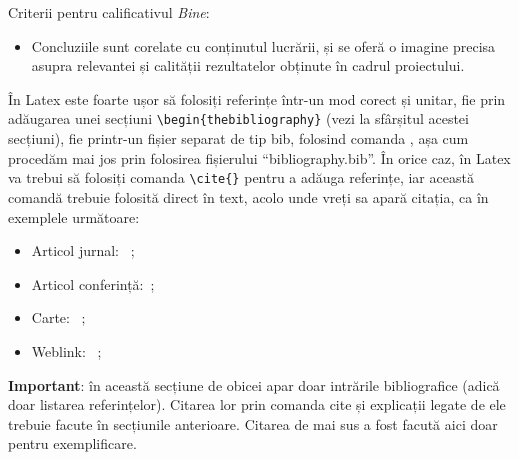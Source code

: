 \documentclass[12pt,a4paper]{report}
\begin{document}
Criterii pentru calificativul \textit{Bine}:
\begin{itemize}
	\item	Concluziile sunt corelate cu conținutul lucrării, și se oferă o imagine precisa asupra relevantei și calității rezultatelor obținute în cadrul proiectului.
\end{itemize}


În Latex este foarte ușor să folosiți referințe într-un mod corect și unitar, fie prin adăugarea unei secțiuni
\verb!\begin{thebibliography}!
(vezi la sfârșitul acestei secțiuni), fie printr-un fișier separat de tip bib, folosind comanda
\verb!!,
așa cum procedăm mai jos prin folosirea fișierului ``bibliography.bib''. În orice caz, în Latex va trebui să folosiți comanda
\verb!\cite{}!
pentru a adăuga referințe, iar această comandă trebuie folosită direct în text, acolo unde vreți sa apară citația, ca în exemplele următoare:
\begin{itemize}
	\item Articol jurnal: ~\cite{article};
	\item Articol conferință:~\cite{proc};
	\item Carte: ~\cite{book};
	\item Weblink: ~\cite{silva};
\end{itemize}

\textbf{Important}: în această secțiune de obicei apar doar intrările bibliografice (adică doar listarea referințelor). Citarea lor prin comanda cite și explicații legate de ele trebuie facute în secțiunile anterioare. Citarea de mai sus a fost facută aici doar pentru exemplificare.





\end{document}

